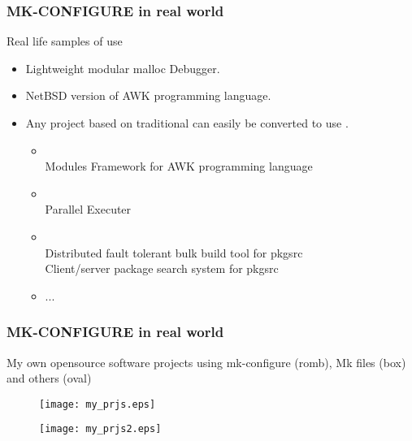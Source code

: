 \documentclass[hyperref={colorlinks=true}]{beamer}
\begin{document}
\begin{frame}[fragile,t]
  \frametitle{MK-CONFIGURE in real world}
  \begin{block}{Real life samples of use}
  \begin{itemize}
  \item Lightweight modular malloc Debugger.\\
  \item NetBSD version of AWK programming language.\\
  \item Any project based on traditional
     can easily be converted
    to use .
    \begin{itemize}
    \item {}\\
      Modules Framework for AWK programming language
    \item {}\\
      Parallel Executer
    \item {}\\
      Distributed fault tolerant bulk build tool for pkgsrc
      \\
      Client/server package search system for pkgsrc
    \item ...
    \end{itemize}
  \end{itemize}
  \end{block}
\end{frame}


\begin{frame}[fragile,t]
  \frametitle{MK-CONFIGURE in real world}
  \begin{block}{My own opensource software projects using
      mk-configure (romb), Mk files (box) and others (oval)}
    \begin{figure}
      \texttt{[image: my\_prjs.eps]}
    \end{figure}
    \begin{figure}
      \texttt{[image: my\_prjs2.eps]}
    \end{figure}
  \end{block}
\end{frame}

\end{document}
